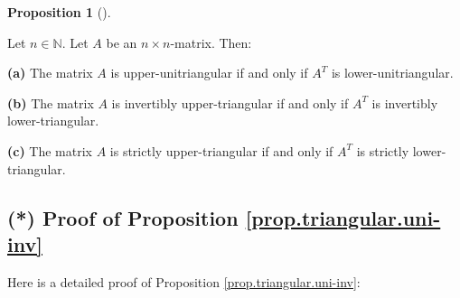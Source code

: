 \documentclass[numbers=enddot,12pt,final,onecolumn,notitlepage]{scrartcl}%
\theoremstyle{definition}
\newtheorem{prop}[theo]{Proposition}
\newenvironment{proposition}[1][]
{\begin{prop}[#1]\begin{leftbar}}
{\end{leftbar}\end{prop}}
\begin{document}
\begin{proposition}
\label{prop.triangular.UT=D.uni}Let $n\in\mathbb{N}$. Let $A$ be an $n\times
n$-matrix. Then:

\textbf{(a)} The matrix $A$ is upper-unitriangular if and only if $A^{T}$ is lower-unitriangular.

\textbf{(b)} The matrix $A$ is invertibly upper-triangular if and only if
$A^{T}$ is invertibly lower-triangular.

\textbf{(c)} The matrix $A$ is strictly upper-triangular if and only if
$A^{T}$ is strictly lower-triangular.
\end{proposition}

\subsection{\label{sect.gauss.triang-proof1}(*) Proof of Proposition
\ref{prop.triangular.uni-inv}}

Here is a detailed proof of Proposition \ref{prop.triangular.uni-inv}:
\end{document}
